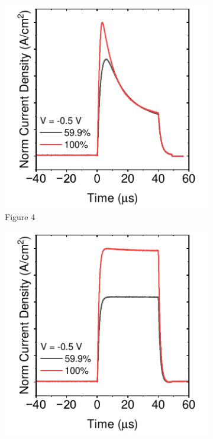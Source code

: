 \begin{figure}[htbp]
    \vspace{1em} %

    \begin{subfigure}[b]{0.3\textwidth}
        \centering
        \includegraphics[width=\textwidth]{chapters/material_properties/images/TPC-08CsBr.pdf}
        \caption{Figure 4}
    \end{subfigure}
    \hfill
    \begin{subfigure}[b]{0.3\textwidth}
        \centering
        \includegraphics[width=\textwidth]{chapters/material_properties/images/TPC-105CsBr.pdf}

\end{subfigure}
\end{figure}
